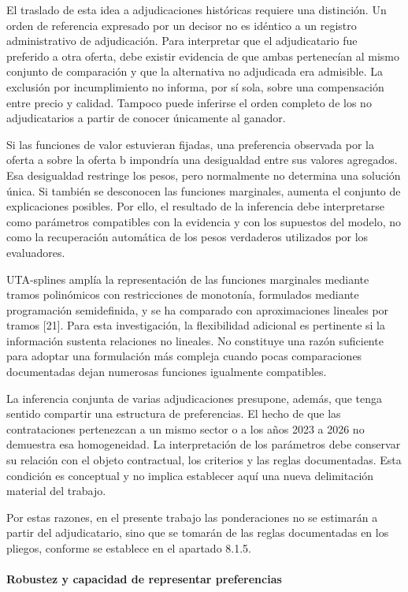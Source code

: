 \documentclass[12pt,a4paper]{article}
\begin{document}
El traslado de esta idea a adjudicaciones históricas requiere una distinción. Un orden de referencia expresado por un decisor no es idéntico a un registro administrativo de adjudicación. Para interpretar que el adjudicatario fue preferido a otra oferta, debe existir evidencia de que ambas pertenecían al mismo conjunto de comparación y que la alternativa no adjudicada era admisible. La exclusión por incumplimiento no informa, por sí sola, sobre una compensación entre precio y calidad. Tampoco puede inferirse el orden completo de los no adjudicatarios a partir de conocer únicamente al ganador.

Si las funciones de valor estuvieran fijadas, una preferencia observada por la oferta a sobre la oferta b impondría una desigualdad entre sus valores agregados. Esa desigualdad restringe los pesos, pero normalmente no determina una solución única. Si también se desconocen las funciones marginales, aumenta el conjunto de explicaciones posibles. Por ello, el resultado de la inferencia debe interpretarse como parámetros compatibles con la evidencia y con los supuestos del modelo, no como la recuperación automática de los pesos verdaderos utilizados por los evaluadores.

UTA-splines amplía la representación de las funciones marginales mediante tramos polinómicos con restricciones de monotonía, formulados mediante programación semidefinida, y se ha comparado con aproximaciones lineales por tramos [21]. Para esta investigación, la flexibilidad adicional es pertinente si la información sustenta relaciones no lineales. No constituye una razón suficiente para adoptar una formulación más compleja cuando pocas comparaciones documentadas dejan numerosas funciones igualmente compatibles.

La inferencia conjunta de varias adjudicaciones presupone, además, que tenga sentido compartir una estructura de preferencias. El hecho de que las contrataciones pertenezcan a un mismo sector o a los años 2023 a 2026 no demuestra esa homogeneidad. La interpretación de los parámetros debe conservar su relación con el objeto contractual, los criterios y las reglas documentadas. Esta condición es conceptual y no implica establecer aquí una nueva delimitación material del trabajo.


Por estas razones, en el presente trabajo las ponderaciones no se estimarán a partir del adjudicatario, sino que se tomarán de las reglas documentadas en los pliegos, conforme se establece en el apartado 8.1.5.

\paragraph{Robustez y capacidad de representar preferencias}
\end{document}
